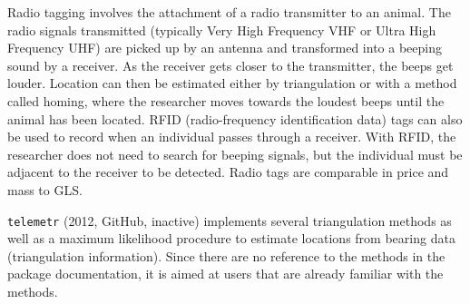 \documentclass[a4paper,12pt]{article}
\newcommand{\Rpkg}[1]{\texttt{#1}}
\begin{document}
Radio tagging involves the attachment of a radio transmitter to an animal. The radio signals transmitted (typically Very High Frequency VHF or Ultra High Frequency UHF) are picked up by an antenna and transformed into a beeping sound by a receiver. As the receiver gets closer to the transmitter, the beeps get louder. Location can then be estimated either by triangulation %
or with a method called homing, where the researcher moves towards the loudest beeps until the animal has been located. %
RFID (radio-frequency identification data) tags can also be used to record when an individual passes through a receiver. With RFID, the researcher does not need to search for beeping signals, but the individual must be adjacent to the receiver to be detected. Radio tags are comparable in price and mass to GLS.  %
%

\Rpkg{telemetr} (2012, GitHub, inactive) implements several triangulation methods as well as a maximum likelihood procedure to estimate locations from bearing data (triangulation information). Since there are no reference to the methods in the package documentation, it is aimed at users that are already familiar with the methods.
\end{document}
